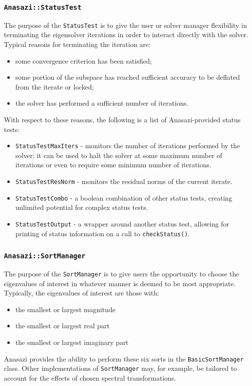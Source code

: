 \documentclass[acmtoms,acmnow]{acmtrans2m}
\newcommand{\aspace}[1]{\texttt{#1}}
\begin{document}
\subsubsection{\aspace{Anasazi::StatusTest}}

The purpose of the \aspace{StatusTest} is to give the user or solver
manager flexibility in terminating the eigensolver iterations in
order to interact directly with the solver. Typical
reasons for terminating the iteration are:
\begin{itemize}
  \item some convergence criterion has been satisfied;
  \item some portion of the subspace has reached sufficient accuracy to be
  deflated from the iterate or locked;
  \item the solver has performed a sufficient number of iterations.
\end{itemize}
With respect to these reasons, the following is a list of Anasazi-provided status tests:
\begin{itemize}
  \item \aspace{StatusTestMaxIters} - monitors the number of iterations
    performed by the solver; it can be used to halt the solver at some maximum number of iterations
    or even to require some minimum number of iterations.
  \item \aspace{StatusTestResNorm} - monitors the residual norms of the
    current iterate.
  \item \aspace{StatusTestCombo} - a boolean combination of
    other status tests, creating unlimited potential for complex status tests.
  \item \aspace{StatusTestOutput} - a wrapper around another
    status test, allowing for printing of status information on a call to
    \verb!checkStatus()!.
\end{itemize}

\subsubsection{\aspace{Anasazi::SortManager}}

The purpose of the \aspace{SortManager} is to give users the opportunity to choose the 
eigenvalues of interest in whatever manner is deemed to be most appropriate. 
Typically, the eigenvalues of interest are those with:
\begin{itemize}
  \item the smallest or largest magnitude
  \item the smallest or largest real part
  \item the smallest or largest imaginary part
\end{itemize}
Anasazi provides the ability to perform these six sorts in the \aspace{BasicSortManager}
class. Other implementations of \aspace{SortManager} may, for example, be tailored to
account for the effects of chosen spectral transformations.
\end{document}

